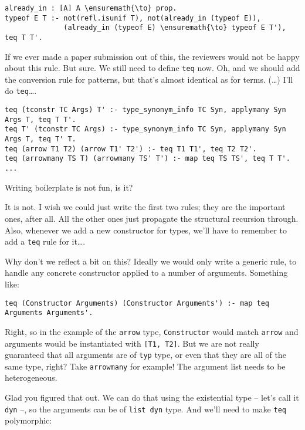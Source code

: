 \begin{verbatim}
already_in : [A] A \ensuremath{\to} prop.
typeof E T :- not(refl.isunif T), not(already_in (typeof E)),
              (already_in (typeof E) \ensuremath{\to} typeof E T'), teq T T'.
\end{verbatim}

\heroSTUDENT{} If we ever made a paper submission out of this, the reviewers
would not be happy about this rule. But sure. We still need to define
\texttt{teq} now. Oh, and we should add the conversion rule for
patterns, but that's almost identical as for terms. (\ldots{}) I'll do
\texttt{teq}\ldots{}.

\begin{verbatim}
teq (tconstr TC Args) T' :- type_synonym_info TC Syn, applymany Syn Args T, teq T T'.
teq T' (tconstr TC Args) :- type_synonym_info TC Syn, applymany Syn Args T, teq T' T.
teq (arrow T1 T2) (arrow T1' T2') :- teq T1 T1', teq T2 T2'.
teq (arrowmany TS T) (arrowmany TS' T') :- map teq TS TS', teq T T'.
...
\end{verbatim}

\heroADVISOR{} Writing boilerplate is not fun, is it?

\heroSTUDENT{} It is not. I wish we could just write the first two rules; they
are the important ones, after all. All the other ones just propagate the
structural recursion through. Also, whenever we add a new constructor
for types, we'll have to remember to add a \texttt{teq} rule for
it\ldots{}.

\heroADVISOR{} Why don't we reflect a bit on this? Ideally we would only write
a generic rule, to handle any concrete constructor applied to a number
of arguments. Something like:

\begin{verbatim}
teq (Constructor Arguments) (Constructor Arguments') :- map teq Arguments Arguments'.
\end{verbatim}

\heroSTUDENT{} Right, so in the example of the \texttt{arrow} type,
\texttt{Constructor} would match \texttt{arrow} and arguments would be
instantiated with \texttt{{[}T1,\ T2{]}}. But we are not really
guaranteed that all arguments are of \texttt{typ} type, or even that
they are all of the same type, right? Take \texttt{arrowmany} for
example! The argument list needs to be heterogeneous.

\heroADVISOR{} Glad you figured that out. We can do that using the existential
type -- let's call it \texttt{dyn} --, so the arguments can be of
\texttt{list\ dyn} type. And we'll need to make \texttt{teq}
polymorphic:

